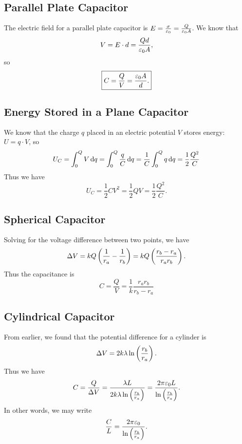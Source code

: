 \documentclass[class=article, crop=false]{standalone}
\begin{document}
  \subsection{Parallel Plate Capacitor}
  The electric field for a parallel plate capacitor is $E = \frac{\sigma}{\varepsilon_0} = \frac{Q}{\varepsilon_0A}$. We know that
  \[
    V = E\cdot d = \frac{Qd}{\varepsilon_0A},
  \]
  so 
  \[
    \boxed{C = \frac{Q}{V} = \frac{\varepsilon_0A}{d}.}
  \]
  \subsection{Energy Stored in a Plane Capacitor}
  We know that the charge $q$ placed in an electric potential $V$ stores energy: $U = q\cdot V$, so
  \[
    U_C = \int_{0}^{Q}V \,\mathrm{d}q = \int_{0}^{Q}\frac{q}{C} \,\mathrm{d}q = \frac{1}{C}\int_{0}^{Q}q \,\mathrm{d}q = \frac{1}{2}\frac{Q^2}{C}
  \]
  Thus we have
  \[
    \boxed{U_C = \frac{1}{2}CV^2 = \frac{1}{2}QV = \frac{1}{2}\frac{Q^2}{C}.}
  \]
  \subsection{Spherical Capacitor}
  Solving for the voltage difference between two points, we have
  \[
    \Delta V = kQ \left( \frac{1}{r_a} - \frac{1}{r_b} \right) = kQ \left( \frac{r_b - r_a}{r_ar_b} \right).
  \]
  Thus the capacitance is
  \[
    C = \frac{Q}{V} = \frac{1}{k}\frac{r_ar_b}{r_b-r_a}
  \]
  \subsection{Cylindrical Capacitor}
  From earlier, we found that the potential difference for a cylinder is
  \[
    \Delta V = 2k\lambda\ln \left( \frac{r_b}{r_a} \right).
  \]
  Thus we have
  \[
    C = \frac{Q}{\Delta V} = \frac{\lambda L}{2k\lambda\ln \left( \frac{r_b}{r_a} \right)} = \frac{2\pi \varepsilon_0 L}{\ln \left( \frac{r_b}{r_a} \right)}.
  \]
  In other words, we may write
  \[
    \frac{C}{L} = \frac{2\pi\varepsilon_0}{\ln \left( \frac{r_b}{r_a} \right)}.
  \]
\end{document}
